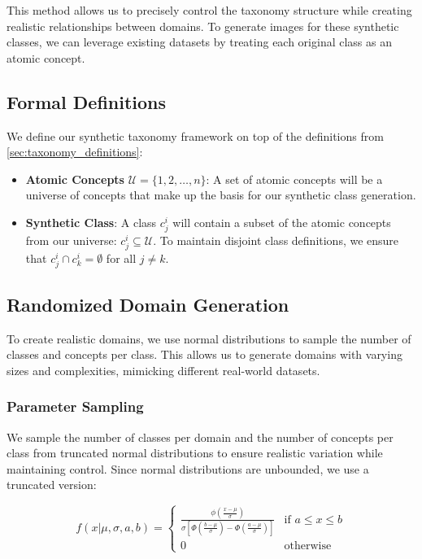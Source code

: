 This method allows us to precisely control the taxonomy structure while creating realistic relationships between domains. To generate images for these synthetic classes, we can leverage existing datasets by treating each original class as an atomic concept.

\subsection{Formal Definitions}

We define our synthetic taxonomy framework on top of the definitions from \autoref{sec:taxonomy_definitions}:

\begin{itemize}
      \item \textbf{Atomic Concepts} $\mathcal{U}=\{1,2,\ldots,n\}$:
            A set of atomic concepts will be a universe of concepts that make up the basis for our synthetic class generation.
      \item \textbf{Synthetic Class}: A class $c^i_j$ will contain a subset of the atomic concepts
            from our universe: $c^i_j \subseteq \mathcal{U}$.
            To maintain disjoint class definitions, we ensure that $c^i_j \cap c^i_k = \emptyset$ for all $j \neq k$.
\end{itemize}

\subsection{Randomized Domain Generation}

To create realistic domains, we use normal distributions to sample the number of classes and concepts per class.
This allows us to generate domains with varying sizes and complexities, mimicking different real-world datasets.

\subsubsection{Parameter Sampling}

We sample the number of classes per domain and the number of concepts per class from truncated normal distributions to ensure realistic variation while maintaining control. Since normal distributions are unbounded, we use a truncated version:

\begin{equation*}
      f(x|\mu, \sigma, a, b) =
      \begin{cases}
            \frac{\phi\left(\frac{x-\mu}{\sigma}\right)}{\sigma\left[\Phi\left(\frac{b-\mu}{\sigma}\right) - \Phi\left(\frac{a-\mu}{\sigma}\right)\right]} & \text{if } a \leq x \leq b \\
            0                                                                                                                                              & \text{otherwise}
      \end{cases}
\end{equation*}

